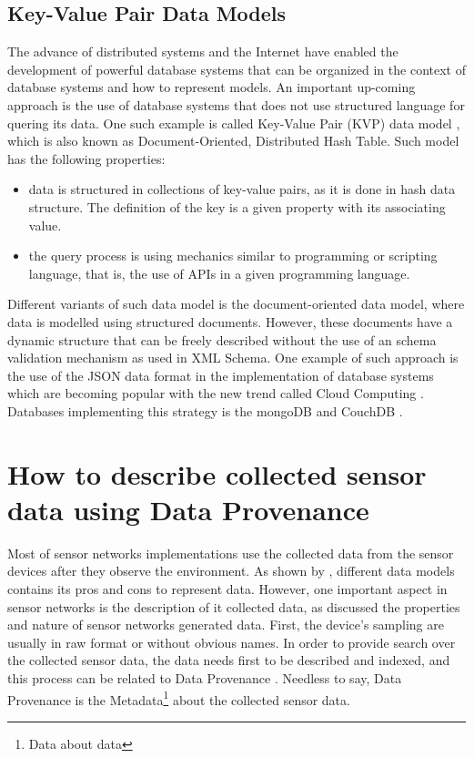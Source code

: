 \subsection{Key-Value Pair Data Models}

The advance of distributed systems and the Internet have enabled the
development of powerful database systems that can be organized in the context
of database systems and how to represent models. An important up-coming
approach is the use of database systems that does not use structured language
for quering its data. One such example is called Key-Value Pair (KVP) data model
\cite{db-kvp}, which is also known as Document-Oriented, Distributed Hash Table.
Such model has the following properties:

\begin{itemize}
  \item data is structured in collections of key-value pairs, as it is done in
  hash data structure. The definition of the key is a given property with its
  associating value.
  \item the query process is using mechanics similar to programming or
  scripting language, that is, the use of APIs in a given programming language.
\end{itemize}

Different variants of such data model is the document-oriented data model,
where data is modelled using structured documents. However, these documents
have a dynamic structure that can be freely described without the use of an
schema validation mechanism as used in XML Schema. One example of such
approach is the use of the JSON data format \cite{json} in the implementation
of database systems which are becoming popular with the new trend called Cloud
Computing \cite{cloud-comp-architectures}. Databases implementing this strategy
is the mongoDB \cite{mongodb} and CouchDB \cite{mongodb}.

\section{How to describe collected sensor data using Data Provenance}
\label{sec:sn-provenance}

Most of sensor networks implementations use the collected data from the sensor
devices after they observe the environment. As shown by
\cite{sn-data-model-survey}, different data models contains its pros and
cons to represent data. However, one important aspect in sensor networks is the
description of it collected data, as \cite{sn-provenance} discussed the
properties and nature of sensor networks generated data. First, the device's
sampling are usually in raw format or without obvious names. In order to
provide search over the collected sensor data, the data needs first to be
described and indexed, and this process can be related to Data Provenance
\cite{db-provenance}. Needless to say, Data Provenance is the 
Metadata\footnote{Data about data} about the collected sensor data.

